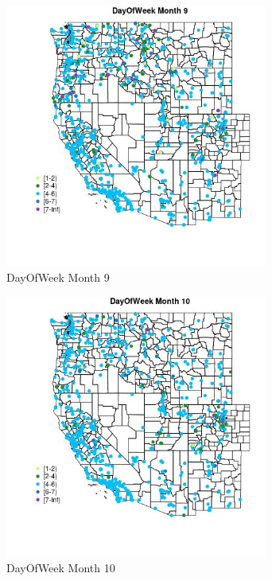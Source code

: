 \begin{figure} 
\centering  
\includegraphics[width=0.77\textwidth]{Code_Outputs/Report_ML_input_PM25_Step4_part_e_de_duplicated_aveswNAs_MapObsMo9DayOfWeek.jpg} 
\caption{\label{fig:Report_ML_input_PM25_Step4_part_e_de_duplicated_aveswNAsMapObsMo9DayOfWeek}DayOfWeek Month 9} 
\end{figure} 
 

\begin{figure} 
\centering  
\includegraphics[width=0.77\textwidth]{Code_Outputs/Report_ML_input_PM25_Step4_part_e_de_duplicated_aveswNAs_MapObsMo10DayOfWeek.jpg} 
\caption{\label{fig:Report_ML_input_PM25_Step4_part_e_de_duplicated_aveswNAsMapObsMo10DayOfWeek}DayOfWeek Month 10} 
\end{figure} 
 

